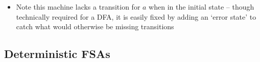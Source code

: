 \begin{itemize}
	
	\item Note this machine lacks a transition for $ a $ when in the initial state -- though technically required for a DFA, it is easily fixed by adding an `error state' to catch what would otherwise be missing transitions
	
\end{itemize}

\clearpage

\subsection{Deterministic FSAs}

